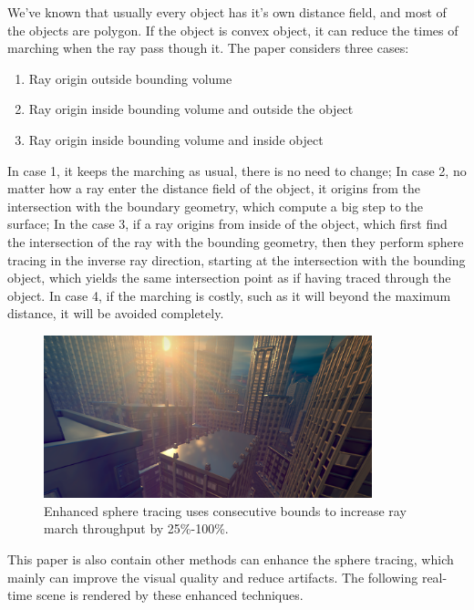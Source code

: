 We've known that usually every object has it's own distance field, and most of the objects are polygon. If the object is convex object, it can reduce the times of marching when the ray pass though it. The paper considers three cases:

\begin{enumerate}
	\item Ray origin outside bounding volume
	\item Ray origin inside bounding volume and outside the object
	\item Ray origin inside bounding volume and inside object
\end{enumerate} 

In case 1, it keeps the marching as usual, there is no need to change; In case 2, no matter how a ray enter the distance field of the object, it origins from the intersection with the boundary geometry, which compute a big step to the surface; In the case 3, if a ray origins from inside of the object, which first find the intersection of the ray with the bounding geometry, then they perform sphere tracing in the inverse ray direction, starting at the intersection with the bounding object, which yields the same intersection point as if having traced through the object. In case 4, if the marching is costly, such as it will beyond the maximum distance, it will be avoided completely. 

\begin{figure}
\begin{center}
	\includegraphics[width=0.85\textwidth]{graphics/df/enhanced-sphere-tracing}	
\end{center}
	\caption{Enhanced sphere tracing uses consecutive bounds to increase ray march throughput by 25\%-100\%.}
\end{figure} 

This paper is also contain other methods can enhance the sphere tracing, which mainly can improve the visual quality and reduce artifacts. The following real-time scene is rendered by these enhanced techniques.


